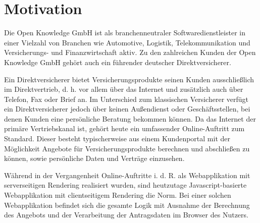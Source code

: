 \vspace{-\baselineskip}

\section{Motivation}

Die Open Knowledge GmbH ist als branchenneutraler Softwaredienstleister in einer Vielzahl von Branchen wie Automotive, Logistik, Telekommunikation und Versicherungs- und Finanzwirtschaft aktiv. Zu den zahlreichen Kunden der Open Knowledge GmbH gehört auch ein führender deutscher Direktversicherer. 

Ein Direktversicherer bietet Versicherungsprodukte seinen Kunden ausschließlich im Direktvertrieb, d. h. vor allem über das Internet und zusätzlich auch über Telefon, Fax oder Brief an. Im Unterschied zum klassischen Versicherer verfügt ein Direktversicherer jedoch über keinen Außendienst oder Geschäftsstellen, bei denen Kunden eine persönliche Beratung bekommen können. Da das Internet der primäre Vertriebskanal ist, gehört heute ein umfassender Online-Auftritt zum Standard. Dieser besteht typischerweise aus einem Kundenportal mit der Möglichkeit Angebote für Versicherungsprodukte berechnen und abschließen zu können, sowie persönliche Daten und Verträge einzusehen.


Während in der Vergangenheit Online-Auftritte i. d. R. als Webapplikation mit serverseitigen Rendering realisiert wurden, sind heutzutage Javascript-basierte Webapplikation mit clientseitigem Rendering die Norm. Bei einer solchen Webapplikation befindet sich die gesamte Logik mit Ausnahme der Berechnung des Angebots und der Verarbeitung der Antragsdaten im Browser des Nutzers.

